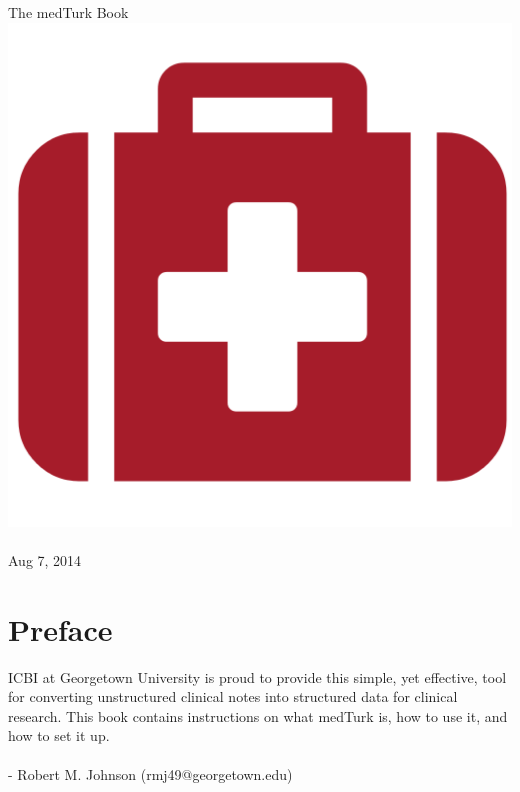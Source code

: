 \documentclass{book}
\begin{document}
\author{Robert M. Johnson \\ rmj49@georgetotwn.edu}



\begin{titlepage}
\begin{center}

{\fontsize{50}{150}\selectfont The medTurk Book}
\includegraphics[scale=0.7]{../ui/img/medkit.png}~  \\[1cm]
Aug 7, 2014
\end{center}
\end{titlepage}


\frontmatter


\chapter*{Preface}
ICBI at Georgetown University is proud to provide this simple, yet effective, tool for converting unstructured clinical notes into structured data for clinical research. This book contains instructions on what medTurk is, how to use it, and how to set it up.
\\
\\
- Robert M. Johnson (rmj49@georgetown.edu)
\end{document}
